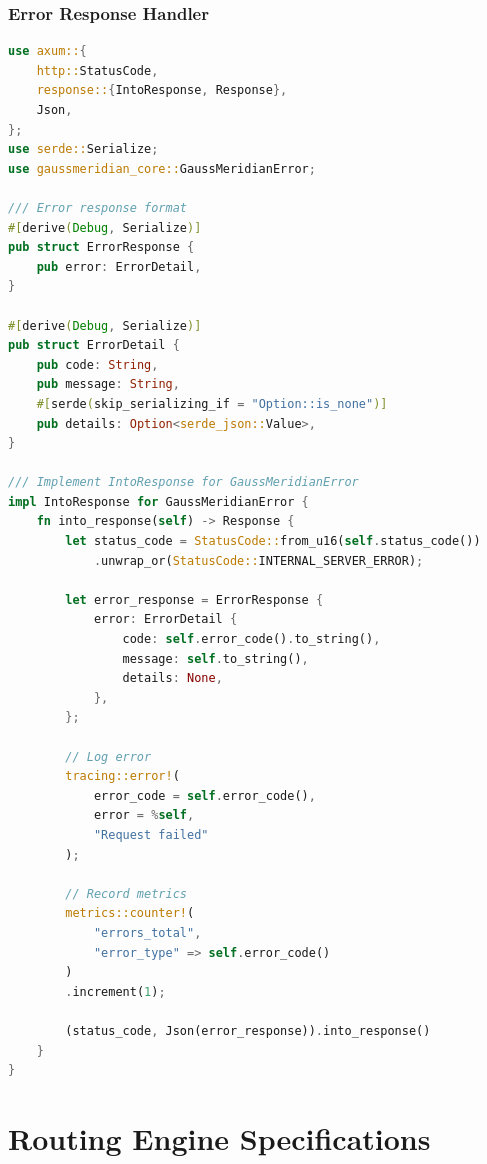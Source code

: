 \documentclass[12pt,a4paper,twoside]{report}
\begin{document}
\subsection{Error Response Handler}

\begin{lstlisting}[language=Rust,caption={Error Handling - crates/gaussmeridian-api/src/error.rs}]
use axum::{
    http::StatusCode,
    response::{IntoResponse, Response},
    Json,
};
use serde::Serialize;
use gaussmeridian_core::GaussMeridianError;

/// Error response format
#[derive(Debug, Serialize)]
pub struct ErrorResponse {
    pub error: ErrorDetail,
}

#[derive(Debug, Serialize)]
pub struct ErrorDetail {
    pub code: String,
    pub message: String,
    #[serde(skip_serializing_if = "Option::is_none")]
    pub details: Option<serde_json::Value>,
}

/// Implement IntoResponse for GaussMeridianError
impl IntoResponse for GaussMeridianError {
    fn into_response(self) -> Response {
        let status_code = StatusCode::from_u16(self.status_code())
            .unwrap_or(StatusCode::INTERNAL_SERVER_ERROR);
        
        let error_response = ErrorResponse {
            error: ErrorDetail {
                code: self.error_code().to_string(),
                message: self.to_string(),
                details: None,
            },
        };
        
        // Log error
        tracing::error!(
            error_code = self.error_code(),
            error = %self,
            "Request failed"
        );
        
        // Record metrics
        metrics::counter!(
            "errors_total",
            "error_type" => self.error_code()
        )
        .increment(1);
        
        (status_code, Json(error_response)).into_response()
    }
}
\end{lstlisting}


\chapter{Routing Engine Specifications}
\end{document}
